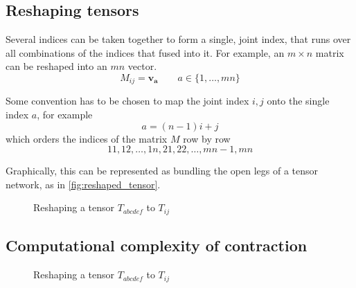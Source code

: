\subsection{Reshaping tensors}
Several indices can be taken together to form a single, joint index, that runs over all
combinations of the indices that fused into it. For example, an $m \times n$ matrix can be
reshaped into an $m n$ vector.
\begin{equation}
  M_{i j} = \bm{v_a} \qquad a \in \{ 1, \dots, m n \}
\end{equation}

Some convention has to be chosen to map the joint index $i, j$ onto the single index $a$,
for example
\begin{equation}
  a = (n - 1)i + j
\end{equation}
which orders the indices of the matrix $M$ row by row
\begin{equation}
  1 1, 1 2, \dots, 1 n, 2 1, 2 2, \dots, m n - 1, m n
\end{equation}

Graphically, this can be represented as bundling the open legs of a tensor network, as in
\autoref{fig:reshaped_tensor}.

\begin{figure}
  
  \caption{Reshaping a tensor $T_{a b c d e f}$ to $T_{i j}$}
  \label{fig:reshaped_tensor}
\end{figure}



\subsection{Computational complexity of contraction}


\begin{figure}
  
  \caption{Reshaping a tensor $T_{a b c d e f}$ to $T_{i j}$}
\end{figure}
